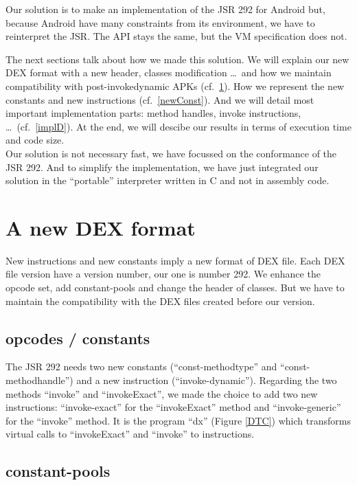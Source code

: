 \documentclass{sig-alternate}
\def \Jsr{JSR\xspace}
\def \JSR{\Jsr 292\xspace}
\begin{document}
  Our solution is to make an implementation of the JSR 292 for Android but,
  because Android have many constraints from its environment,
  we have to reinterpret the JSR.
  The API stays the same, but the VM specification does not.

  The next sections talk about how we made this solution.
  We will explain our new DEX format with a new header, classes modification
  \dots~and how we maintain compatibility with post-invokedynamic APKs (cf.~\ref{newDEX}).
  How we represent the new constants and new instructions (cf.~\ref{newConst}).
  And we will detail most important implementation parts: method handles, invoke instructions, \dots~(cf.~\ref{implD}).
  At the end, we will descibe our results in terms of execution time and code size.\\

  Our solution is not necessary fast, we have focussed on the conformance of the \JSR.
  And to simplify the implementation, we have just integrated our solution in the ``portable'' interpreter written in C and not in assembly code.
  
\section{A new DEX format}
\label{newDEX}

  New instructions and new constants imply a new format of DEX file.
  Each DEX file version have a version number, our one is number 292.
  We enhance the opcode set, add constant-pools and change the header of classes.
  But we have to maintain the compatibility with the DEX files created before our version.

  \subsection{opcodes / constants}
    The \JSR needs two new constants (``const-methodtype'' and ``const-methodhandle'') and a new instruction (``invoke-dynamic'').
    Regarding the two methods ``invoke'' and ``invokeExact'', we made the choice to add two new instructions:
    ``invoke-exact'' for the ``invokeExact'' method and ``invoke-generic'' for the ``invoke'' method.
    It is the program ``dx'' (Figure \ref{DTC}) which transforms virtual calls to ``invokeExact'' and ``invoke'' to instructions.

  \subsection{constant-pools}
    \label{CP}
\end{document}

